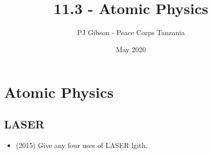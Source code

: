 \documentclass{article}
\title{11.3 - Atomic Physics}
\author{PJ Gibson - Peace Corps Tanzania}
\date{May 2020}
\begin{document}
\maketitle


\section{Atomic Physics}

\subsection{LASER}
\begin{itemize}
\item (2015)  Give any four uses of LASER lgith.
\end{itemize}
\end{document}
